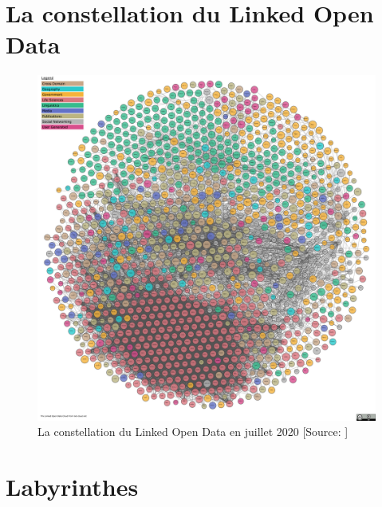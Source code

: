 \chapter{\label{annexe_lod}La constellation du Linked Open Data}

\begin{figure}[!h]
\centering
\includegraphics[width=16cm]{images/lod-cloud-sm.jpg}
\caption[La constellation du Linked Open Data en juillet 2020]{La constellation du Linked Open Data en juillet 2020 [Source: \cite{noauthor_linked_2020}]}
\label{lod_cloud}
\end{figure}

\chapter{\label{annexe_laby}Labyrinthes}


